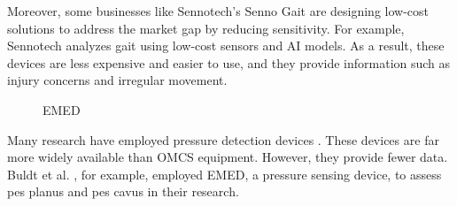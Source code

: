 Moreover, some businesses like Sennotech's Senno Gait are designing low-cost solutions to address the market gap by reducing sensitivity. For example, Sennotech \cite{sennotech_2021} analyzes gait using low-cost sensors and AI models. As a result, these devices are less expensive and easier to use, and they provide information such as injury concerns and irregular movement.

\begin{figure}[htbp]
\centering
{}
\caption{EMED \cite{articleFootPressure}}
\label{fig:BackgroundExampleEmed}
\end{figure}

Many research \cite{Buldt2018FootPI, articleKeukenkampDiabeticMedicine, BOSCH2010564} have employed pressure detection devices \cite{novel_2021, medilogic_2021}. These devices are far more widely available than OMCS equipment. However, they provide fewer data. Buldt et al. \cite{Buldt2018FootPI}, for example, employed EMED, a pressure sensing device, to assess pes planus and pes cavus in their research.

